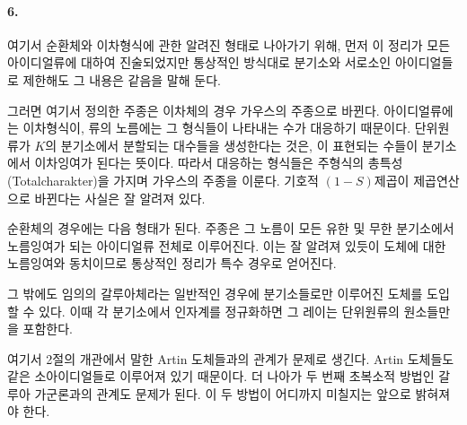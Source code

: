 \paragraph{6.}
여기서 순환체와 이차형식에 관한 알려진 형태로 나아가기 위해, 먼저 이 정리가 모든 아이디얼류에 대하여 진술되었지만 통상적인 방식대로 분기소와 서로소인 아이디얼들로 제한해도 그 내용은 같음을 말해 둔다.

그러면 여기서 정의한 주종은 이차체의 경우 가우스의 주종으로 바뀐다. 아이디얼류에는 이차형식이, 류의 노름에는 그 형식들이 나타내는 수가 대응하기 때문이다. 단위원류가 \(K\)의 분기소에서 분할되는 대수들을 생성한다는 것은, 이 표현되는 수들이 분기소에서 이차잉여가 된다는 뜻이다. 따라서 대응하는 형식들은 주형식의 총특성(Totalcharakter)을 가지며 가우스의 주종을 이룬다. 기호적 \((1-S)\)제곱이 제곱연산으로 바뀐다는 사실은 잘 알려져 있다.

순환체의 경우에는 다음 형태가 된다. 주종은 그 노름이 모든 유한 및 무한 분기소에서 노름잉여가 되는 아이디얼류 전체로 이루어진다. 이는 잘 알려져 있듯이 \glqq{}도체에 대한 노름잉여\grqq{}와 동치이므로 통상적인 정리가 특수 경우로 얻어진다.

그 밖에도 임의의 갈루아체라는 일반적인 경우에 분기소들로만 이루어진 도체를 도입할 수 있다. 이때 각 분기소에서 인자계를 정규화하면 그 레이는 단위원류의 원소들만을 포함한다.

여기서 2절의 개관에서 말한 Artin 도체들과의 관계가 문제로 생긴다. Artin 도체들도 같은 소아이디얼들로 이루어져 있기 때문이다. 더 나아가 두 번째 초복소적 방법인 갈루아 가군론과의 관계도 문제가 된다. 이 두 방법이 어디까지 미칠지는 앞으로 밝혀져야 한다.

\endgroup
